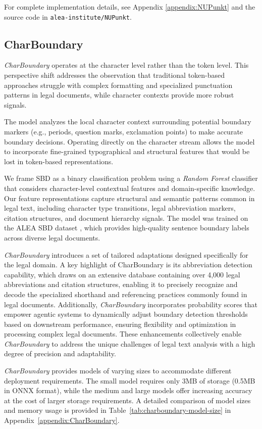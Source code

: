 For complete implementation details, see Appendix \ref{appendix:NUPunkt} and the source code in \texttt{alea-institute/NUPunkt}.

\subsection{CharBoundary}
\textit{CharBoundary} operates at the character level rather than the token level. This perspective shift addresses the observation that traditional token-based approaches struggle with complex formatting and specialized punctuation patterns in legal documents, while character contexts provide more robust signals.

The model analyzes the local character context surrounding potential boundary markers (e.g., periods, question marks, exclamation points) to make accurate boundary decisions. Operating directly on the character stream allows the model to incorporate fine-grained typographical and structural features that would be lost in token-based representations.

We frame SBD as a binary classification problem using a \textit{Random Forest} classifier \cite{breiman2001random} that considers character-level contextual features and domain-specific knowledge. Our feature representations capture structural and semantic patterns common in legal text, including character type transitions, legal abbreviation markers, citation structures, and document hierarchy signals.  The model was trained on the ALEA SBD dataset \cite{alea-benchmark}, which provides high-quality sentence boundary labels across diverse legal documents.

\textit{CharBoundary} introduces a set of tailored adaptations designed specifically for the legal domain.  A key highlight of CharBoundary is its abbreviation detection capability, which draws on an extensive database containing over 4,000 legal abbreviations and citation structures, enabling it to precisely recognize and decode the specialized shorthand and referencing practices commonly found in legal documents.  Additionally, \textit{CharBoundary} incorporates probability scores that empower agentic systems to dynamically adjust boundary detection thresholds based on downstream performance, ensuring flexibility and optimization in processing complex legal documents.  These enhancements collectively enable \textit{CharBoundary} to address the unique challenges of legal text analysis with a high degree of precision and adaptability.

\textit{CharBoundary} provides models of varying sizes to accommodate different deployment requirements. The small model requires only 3MB of storage (0.5MB in ONNX format), while the medium and large models offer increasing accuracy at the cost of larger storage requirements. A detailed comparison of model sizes and memory usage is provided in Table~\ref{tab:charboundary-model-size} in Appendix~\ref{appendix:CharBoundary}.

